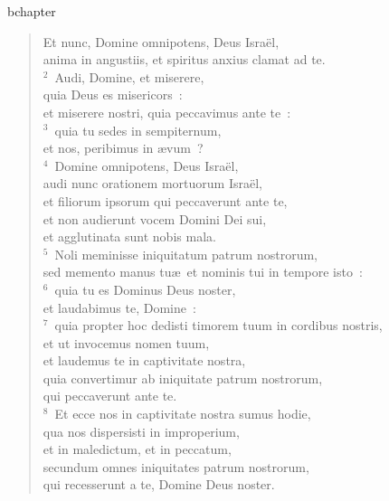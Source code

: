 bchapter\begin{flushleft}\begin{verse}\vspace{-19pt}Et nunc, Domine omnipotens, Deus Isra\"el,\\ anima in angustiis, et spiritus anxius clamat ad te.\\
${}^{2}$~Audi, Domine, et miserere,\\ quia Deus es misericors~:\\ et miserere nostri, quia peccavimus ante te~:\\
${}^{3}$~quia tu sedes in sempiternum,\\ et nos, peribimus in \ae vum~?\\
${}^{4}$~Domine omnipotens, Deus Isra\"el,\\ audi nunc orationem mortuorum Isra\"el,\\ et filiorum ipsorum qui peccaverunt ante te,\\ et non audierunt vocem Domini Dei sui,\\ et agglutinata sunt nobis mala.\\
${}^{5}$~Noli meminisse iniquitatum patrum nostrorum,\\ sed memento manus tu\ae\ et nominis tui in tempore isto~:\\
${}^{6}$~quia tu es Dominus Deus noster,\\ et laudabimus te, Domine~:\\
${}^{7}$~quia propter hoc dedisti timorem tuum in cordibus nostris,\\ et ut invocemus nomen tuum,\\ et laudemus te in captivitate nostra,\\ quia convertimur ab iniquitate patrum nostrorum,\\ qui peccaverunt ante te.\\
${}^{8}$~Et ecce nos in captivitate nostra sumus hodie,\\ qua nos dispersisti in improperium,\\ et in maledictum, et in peccatum,\\ secundum omnes iniquitates patrum nostrorum,\\ qui recesserunt a te, Domine Deus noster.\end{verse}\end{flushleft}


